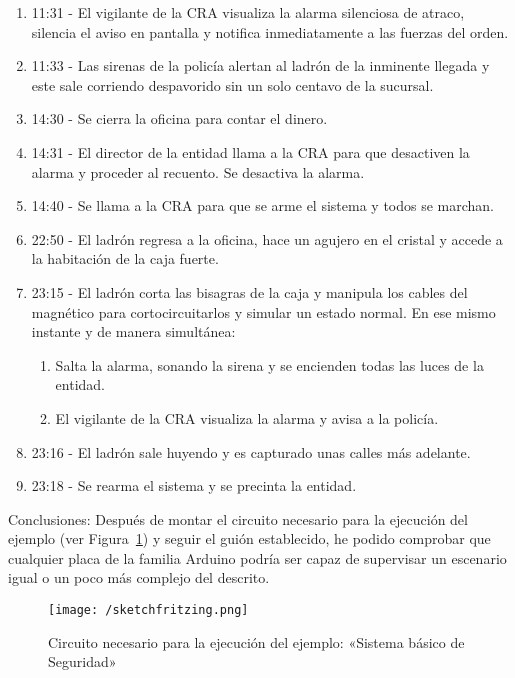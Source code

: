 \begin{definitionlist}
\begin{enumerate}
\item 11:31 - El vigilante de la \acs{CRA} visualiza la alarma silenciosa de atraco, silencia el aviso en pantalla y notifica inmediatamente a las fuerzas del orden.
\item 11:33 - Las sirenas de la policía alertan al ladrón de la inminente llegada y este sale corriendo despavorido sin un solo centavo de la sucursal.
\item 14:30 - Se cierra la oficina para contar el dinero.
\item 14:31 - El director de la entidad llama a la CRA para que desactiven la alarma y proceder al recuento. Se desactiva la alarma.
\item 14:40 - Se llama a la CRA para que se arme el sistema y todos se marchan.
\item 22:50 - El ladrón regresa a la oficina, hace un agujero en el cristal y accede a la habitación de la caja fuerte.
\item 23:15 - El ladrón corta las bisagras de la caja y manipula los cables del magnético para cortocircuitarlos y simular un estado normal. En ese mismo instante y de manera simultánea:
\begin{enumerate}
\item Salta la alarma, sonando la sirena y se encienden todas las luces de la entidad.
\item El vigilante de la CRA visualiza la alarma y avisa a la policía.
\end{enumerate}
\item 23:16 - El ladrón sale huyendo y es capturado unas calles más adelante.
\item 23:18 - Se rearma el sistema y se precinta la entidad.
\end{enumerate}

\item[Conclusiones:] Después de montar el circuito necesario para la ejecución del ejemplo (ver Figura~\ref{fig:sketchfritzing}) y seguir el guión establecido, he podido comprobar que cualquier placa de la familia Arduino podría ser capaz de supervisar un escenario igual o un poco más complejo del descrito. 

\end{definitionlist}

\begin{figure}[!h]
\centering
\texttt{[image: /sketchfritzing.png]}
\caption{Circuito necesario para la ejecución del ejemplo: «Sistema básico de Seguridad»}
\label{fig:sketchfritzing}
\end{figure}

